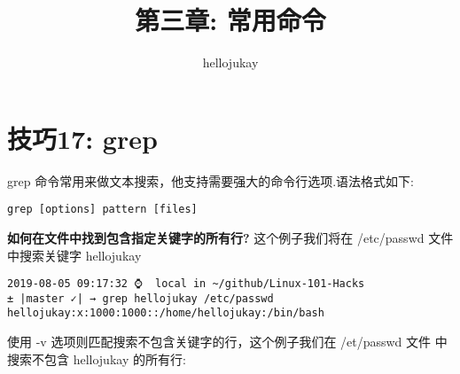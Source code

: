 \documentclass[UTF8]{ctexart}
\title{第三章: 常用命令}
\author{hellojukay}
\begin{document}
\section*{技巧17: grep}
grep 命令常用来做文本搜索，他支持需要强大的命令行选项.语法格式如下:
\begin{lstlisting}
grep [options] pattern [files]  
\end{lstlisting}
\textbf{如何在文件中找到包含指定关键字的所有行?}\newline
这个例子我们将在 /etc/passwd 文件中搜索关键字 hellojukay
\begin{lstlisting}
2019-08-05 09:17:32 ⌚  local in ~/github/Linux-101-Hacks
± |master ✓| → grep hellojukay /etc/passwd
hellojukay:x:1000:1000::/home/hellojukay:/bin/bash       
\end{lstlisting}
使用 -v 选项则匹配搜索不包含关键字的行，这个例子我们在 /et/passwd 文件
中搜索不包含 hellojukay 的所有行:
\end{document}

